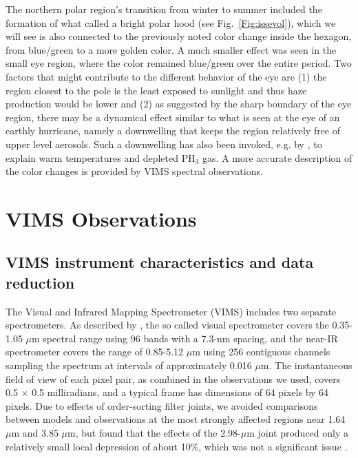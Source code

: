 \documentclass[article,11pt]{emulateapj}
\def\mum{$\mu$m }
\def\mumx{$\mu$m}
\def\pht{PH$_3$ }
\begin{document}
The northern polar region's transition
from winter to summer included the formation of what \cite{Sayanagi2016DPS}
called a bright polar hood (see Fig.\ \ref{Fig:issevol}), which
we will see is also connected to the
previously noted color change inside the hexagon, from
blue/green to a more golden color.  A much smaller effect was seen in the
small eye region, where the color remained blue/green over the entire
period. Two factors that might contribute to the different behavior of
the eye are (1) the region closest to the pole is the least exposed to
sunlight and thus haze production would be lower and (2) as suggested
by the sharp boundary of the eye region, there may be a dynamical effect
similar to what is seen at the eye of an earthly hurricane, namely a
downwelling that keeps the region relatively free of upper level
aerosols. Such a downwelling has also been invoked, e.g. by \cite{Fletcher2008}, to explain
warm temperatures and depleted \pht gas.  A more accurate description of the color changes is
provided by VIMS spectral observations.

\section{VIMS Observations} 


\subsection{VIMS instrument characteristics and data reduction}

The Visual and Infrared Mapping Spectrometer (VIMS) includes two
separate spectrometers. As described by \cite{Brown2004}, the so called
visual spectrometer covers the 0.35-1.05 \mum spectral range using
 96 bands with a 7.3-nm spacing, and the
near-IR spectrometer covers the range of 0.85-5.12 \mum using 256
contiguous channels sampling the spectrum at intervals of
approximately 0.016 \mumx. The instantaneous field of view of each
pixel pair, as combined in the observations we used, covers 0.5 $\times$
0.5 milliradians, and a typical frame has dimensions of 64 pixels by
64 pixels.  Due to effects of order-sorting filter joints, we avoided
comparisons between models and observations at the most strongly
affected regions near 1.64 \mum and 3.85 \mumx, but found that the
effects of the 2.98-\mum joint produced only a relatively small local
 depression of about 10\%, which was not a significant issue \citep{Sro2013gws}.
\end{document}
